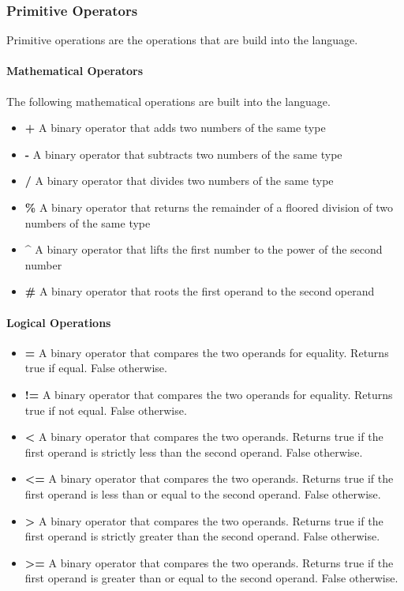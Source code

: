 \subsubsection{Primitive Operators}
\label{subsec:primitiveOps}

Primitive operations are the operations that are build into the language.

\paragraph{Mathematical Operators}
\label{sec:mathOps}

The following mathematical operations are built into the language.

\begin{itemize}
  \item \textbf{+} A binary operator that adds two numbers of the same type
  \item \textbf{-} A binary operator that subtracts two numbers of the same type
  \item \textbf{/} A binary operator that divides two numbers of the same type
  \item \textbf{\%} A binary operator that returns the remainder of a floored division of two numbers of the same type
  \item \textbf{\^}  A binary operator that lifts the first number to the power of the second number
  \item \textbf{\#} A binary operator that roots the first operand to the second operand
\end{itemize}


\paragraph{Logical Operations}
\label{sec:logicOps}

\begin{itemize}
  \item \textbf{=} A binary operator that compares the two operands for equality. Returns true if equal. False otherwise.
  \item \textbf{!=} A binary operator that compares the two operands for equality. Returns true if not equal. False otherwise.
  \item \textbf{<} A binary operator that compares the two operands. Returns true if the first operand is strictly less than the second operand. False otherwise.
  \item \textbf{<=} A binary operator that compares the two operands. Returns true if the first operand is less than or equal to the second operand. False otherwise.
  \item \textbf{>} A binary operator that compares the two operands. Returns true if the first operand is strictly greater than the second operand. False otherwise.
  \item \textbf{>=} A binary operator that compares the two operands. Returns true if the first operand is greater than or equal to the second operand. False otherwise.
\end{itemize}

